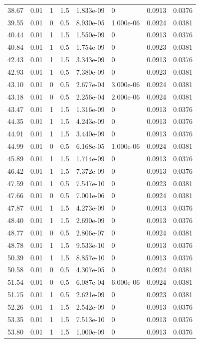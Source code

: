 \documentclass[preview]{standalone}
\begin{document}
{{{\begin{tabular}{L{1.2cm}C{1.2cm} C{0.3cm}C{0.5cm} C{1.4cm}C{1.4cm} C{1.4cm}C{1.4cm}}
  38.67  &  0.01  & 1     & 1.5 &  1.833e-09  & 0  & 0.0913 &  0.0376   \\ 
  39.55  &  0.01  & 0     & 0.5 &  8.930e-05  & 1.000e-06  & 0.0924 &  0.0381   \\ 
  40.44  &  0.01  & 1     & 1.5 &  1.550e-09  & 0  & 0.0913 &  0.0376   \\ 
  40.84  &  0.01  & 1     & 0.5 &  1.754e-09  & 0  & 0.0923 &  0.0381   \\ 
  42.43  &  0.01  & 1     & 1.5 &  3.343e-09  & 0  & 0.0913 &  0.0376   \\ 
  42.93  &  0.01  & 1     & 0.5 &  7.380e-09  & 0  & 0.0923 &  0.0381   \\ 
  43.10  &  0.01  & 0     & 0.5 &  2.677e-04  & 3.000e-06  & 0.0924 &  0.0381   \\ 
  43.18  &  0.01  & 0     & 0.5 &  2.256e-04  & 2.000e-06  & 0.0924 &  0.0381   \\ 
  43.47  &  0.01  & 1     & 1.5 &  1.316e-09  & 0  & 0.0913 &  0.0376   \\ 
  44.35  &  0.01  & 1     & 1.5 &  4.243e-09  & 0  & 0.0913 &  0.0376   \\ 
  44.91  &  0.01  & 1     & 1.5 &  3.440e-09  & 0  & 0.0913 &  0.0376   \\ 
  44.99  &  0.01  & 0     & 0.5 &  6.168e-05  & 1.000e-06  & 0.0924 &  0.0381   \\ 
  45.89  &  0.01  & 1     & 1.5 &  1.714e-09  & 0  & 0.0913 &  0.0376   \\ 
  46.42  &  0.01  & 1     & 1.5 &  7.372e-09  & 0  & 0.0913 &  0.0376   \\ 
  47.59  &  0.01  & 1     & 0.5 &  7.547e-10  & 0  & 0.0923 &  0.0381   \\ 
  47.66  &  0.01  & 0     & 0.5 &  7.001e-06  & 0  & 0.0924 &  0.0381   \\ 
  47.87  &  0.01  & 1     & 1.5 &  4.273e-09  & 0  & 0.0913 &  0.0376   \\ 
  48.40  &  0.01  & 1     & 1.5 &  2.690e-09  & 0  & 0.0913 &  0.0376   \\ 
  48.77  &  0.01  & 0     & 0.5 &  2.806e-07  & 0  & 0.0924 &  0.0381   \\ 
  48.78  &  0.01  & 1     & 1.5 &  9.533e-10  & 0  & 0.0913 &  0.0376   \\ 
  50.39  &  0.01  & 1     & 1.5 &  8.857e-10  & 0  & 0.0913 &  0.0376   \\ 
  50.58  &  0.01  & 0     & 0.5 &  4.307e-05  & 0  & 0.0924 &  0.0381   \\ 
  51.54  &  0.01  & 0     & 0.5 &  6.087e-04  & 6.000e-06  & 0.0924 &  0.0381   \\ 
  51.75  &  0.01  & 1     & 0.5 &  2.621e-09  & 0  & 0.0923 &  0.0381   \\ 
  52.26  &  0.01  & 1     & 1.5 &  2.542e-09  & 0  & 0.0913 &  0.0376   \\ 
  53.35  &  0.01  & 1     & 1.5 &  7.513e-10  & 0  & 0.0913 &  0.0376   \\ 
  53.80  &  0.01  & 1     & 1.5 &  1.000e-09  & 0  & 0.0913 &  0.0376   \\ 
\hline 
\end{tabular} 

}}}
\end{document}
